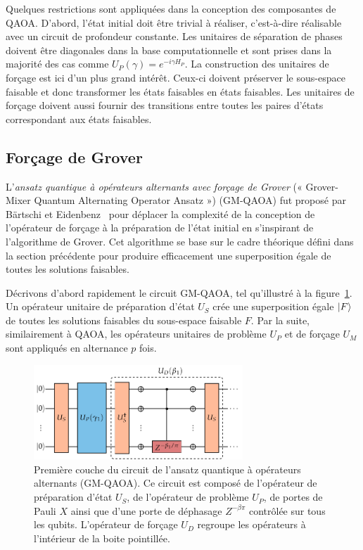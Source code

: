 Quelques restrictions sont appliquées dans la conception des composantes de QAOA. D'abord, l'état initial doit être trivial à réaliser, c'est-à-dire réalisable avec un circuit de profondeur constante. Les unitaires de séparation de phases doivent être diagonales dans la base computationnelle et sont prises dans la majorité des cas comme $U_{P}(\gamma) = e^{-i \gamma H_{P}}$. La construction des unitaires de forçage est ici d'un plus grand intérêt. Ceux-ci doivent préserver le sous-espace faisable et donc transformer les états faisables en états faisables. Les unitaires de forçage doivent aussi fournir des transitions entre toutes les paires d'états correspondant aux états faisables.


\subsection{Forçage de Grover}
\label{subsec:forcage-de-grover}

L'\textit{ansatz quantique à opérateurs alternants avec forçage de Grover} (« Grover-Mixer Quantum Alternating Operator Ansatz ») (GM-QAOA) fut proposé par Bärtschi et Eidenbenz~\cite{bartschiGroverMixersQAOA2020} pour déplacer la complexité de la conception de l'opérateur de forçage à la préparation de l'état initial en s'inspirant de l'algorithme de Grover. Cet algorithme se base sur le cadre théorique défini dans la section précédente pour produire efficacement une superposition égale de toutes les solutions faisables.

Décrivons d'abord rapidement le circuit GM-QAOA, tel qu'illustré à la figure~\ref{fig:gm-qaoa}. Un opérateur unitaire de préparation d'état $U_{S}$ crée une superposition égale $\ket{F}$ de toutes les solutions faisables du sous-espace faisable $F$. Par la suite, similairement à QAOA, les opérateurs unitaires de problème $U_{P}$ et de forçage $U_{M}$ sont appliqués en alternance $p$ fois.

\begin{figure}[ht!]
    \centering
    \includegraphics[width=0.7\textwidth]{figures/gm-qaoa}
    \caption[Circuit de l'ansatz quantique à opérateurs alternants avec forçage de Grover]{Première couche du circuit de l'ansatz quantique à opérateurs alternants (GM-QAOA). Ce circuit est composé de l'opérateur de préparation d'état $U_{S}$, de l'opérateur de problème $U_{P}$, de portes de Pauli $X$ ainsi que d'une porte de déphasage $Z^{-\beta \pi}$ contrôlée sur tous les qubits. L'opérateur de forçage $U_{D}$ regroupe les opérateurs à l'intérieur de la boite pointillée.}
    \label{fig:gm-qaoa}
\end{figure}

